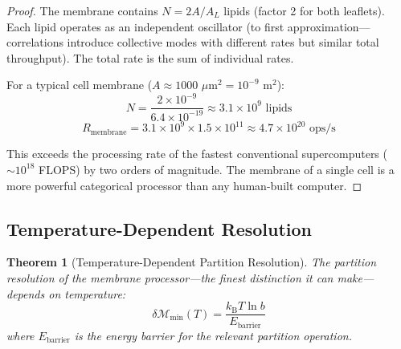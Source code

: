 \documentclass[twocolumn,10pt]{article}
\newtheorem{theorem}{Theorem}[section]
\theoremstyle{remark}
\newcommand{\kB}{k_{\mathrm{B}}}
\newcommand{\Depth}{\mathcal{M}}
\begin{document}
\begin{proof}
The membrane contains $N = 2A/A_L$ lipids (factor 2 for both leaflets). Each lipid operates as an independent oscillator (to first approximation---correlations introduce collective modes with different rates but similar total throughput). The total rate is the sum of individual rates.

For a typical cell membrane ($A \approx 1000$ $\mu$m$^2 = 10^{-9}$ m$^2$):
\begin{equation}
    N = \frac{2 \times 10^{-9}}{6.4 \times 10^{-19}} \approx 3.1 \times 10^{9} \text{ lipids}
\end{equation}
\begin{equation}
    R_{\text{membrane}} = 3.1 \times 10^{9} \times 1.5 \times 10^{11} \approx 4.7 \times 10^{20} \text{ ops/s}
\end{equation}

This exceeds the processing rate of the fastest conventional supercomputers ($\sim 10^{18}$ FLOPS) by two orders of magnitude. The membrane of a single cell is a more powerful categorical processor than any human-built computer.
\end{proof}

\subsection{Temperature-Dependent Resolution}

\begin{theorem}[Temperature-Dependent Partition Resolution]
\label{thm:resolution}
The partition resolution of the membrane processor---the finest distinction it can make---depends on temperature:
\begin{equation}
    \delta\Depth_{\min}(T) = \frac{\kB T \ln b}{E_{\text{barrier}}}
\end{equation}
where $E_{\text{barrier}}$ is the energy barrier for the relevant partition operation.
\end{theorem}
\end{document}

